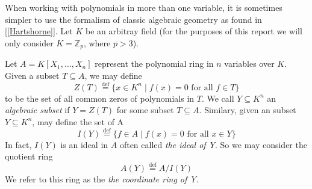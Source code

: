 
When working with polynomials in more than one variable, it is sometimes simpler to use the formalism of classic algebraic geometry as found in [\ref{Hartshorne}]. Let $K$ be an arbitray field (for the purposes of this report we will only consider $K = \mathbb{Z}_p$, where $p>3$).


Let $A = K[X_1,...,X_n]$ represent the polynomial ring in $n$ variables over $K$. Given a subset $T \subseteq A $, we may define $$Z(T) \stackrel{\text{def}}{=} \lbrace x \in K^n \mid f(x) = 0 \text{ for all } f \in T \rbrace $$ to be the set of all common zeros of polynomials in $T$. We call $Y \subseteq K^n $ an \textit{algebraic subset} if $Y = Z(T)$ for some subset $T \subseteq A$. Similary, given an subset $Y \subseteq K^n$, may define the set of A $$ I(Y) \stackrel{\text{def}}{=} \lbrace f \in A \mid f(x) = 0 \text { for all } x \in Y \rbrace $$ In fact, $I(Y)$ is an ideal in $A$ often called \textit{the ideal of Y}. So we may consider the quotient ring $$A(Y) \stackrel{\text{def}}{=} A / I(Y) $$ We refer to this ring as the \textit{the coordinate ring of Y}.  



